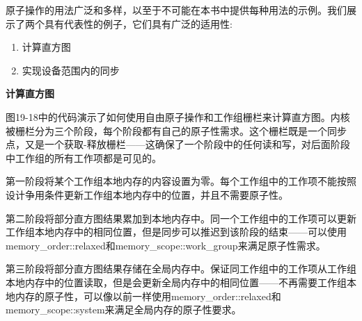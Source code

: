 原子操作的用法广泛和多样，以至于不可能在本书中提供每种用法的示例。我们展示了两个具有代表性的例子，它们具有广泛的适用性:\par
	
\begin{enumerate}
	\item 计算直方图
	\item 实现设备范围内的同步
\end{enumerate}

\hspace*{\fill} \par %
\textbf{计算直方图}

图19-18中的代码演示了如何使用自由原子操作和工作组栅栏来计算直方图。内核被栅栏分为三个阶段，每个阶段都有自己的原子性需求。这个栅栏既是一个同步点，又是一个获取-释放栅栏——这确保了一个阶段中的任何读和写，对后面阶段中工作组的所有工作项都是可见的。\par

第一阶段将某个工作组本地内存的内容设置为零。每个工作组中的工作项不能按照设计争用条件更新工作组本地内存中的位置，并且不需要原子性。\par

第二阶段将部分直方图结果累加到本地内存中。同一个工作组中的工作项可以更新工作组本地内存中的相同位置，但是同步可以推迟到该阶段的结束——可以使用memory\_order::relaxed和memory\_scope::work\_group来满足原子性需求。\par

第三阶段将部分直方图结果存储在全局内存中。保证同工作组中的工作项从工作组本地内存中的位置读取，但是会更新全局内存中的相同位置——不再需要工作组本地内存的原子性，可以像以前一样使用memory\_order::relaxed和memory\_scope::system来满足全局内存的原子性要求。\par

